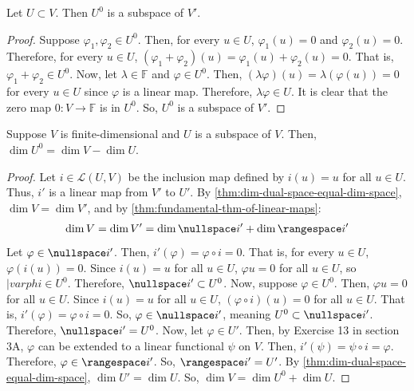 \documentclass{article}
\begin{document}
\begin{theorem}
  \label{thm:the-annihilator-is-a-subspace}
  Let $U \subset V$. Then $U^0$ is a subspace of $V'$.
\end{theorem}
\begin{proof}
  Suppose $\varphi_1, \varphi_2 \in U^0$. Then, for every $u \in U$,
  $\varphi_1(u) = 0$ and $\varphi_2(u) = 0$. Therefore, for every $u
  \in U$, $(\varphi_1 + \varphi_2)(u) = \varphi_1(u) + \varphi_2(u) =
  0$. That is, $\varphi_1 + \varphi_2 \in U^0$. Now, let $\lambda \in
  \mathbb{F}$ and $\varphi \in U^0$. Then, $(\lambda \varphi)(u) =
  \lambda (\varphi(u)) = 0$ for every $u \in U$ since $\varphi$ is a
  linear map. Therefore, $\lambda \varphi \in U$. It is clear that the
  zero map $0: V \rightarrow \mathbb{F}$ is in $U^0$. So, $U^0$ is a
  subspace of $V'$.
\end{proof}

\begin{theorem}
  \label{thm:dimension-of-the-annihilator}
  Suppose $V$ is finite-dimensional and $U$ is a subspace of
  $V$. Then, $\dim U^0 = \dim V - \dim U$.
\end{theorem}
\begin{proof}
  Let $i \in \mathcal{L}(U, V)$ be the inclusion map defined by $i(u)
  = u$ for all $u \in U$. Thus, $i'$ is a linear map from $V'$ to
  $U'$. By \cref{thm:dim-dual-space-equal-dim-space}, $\dim V = \dim
  V'$, and by \cref{thm:fundamental-thm-of-linear-maps}:
  \begin{align*}
    \dim V = \dim V' = \dim \nullspace i' + \dim \rangespace i'
  \end{align*}
  Let $\varphi \in \nullspace i'$. Then, $i'(\varphi) = \varphi \circ
  i = 0$. That is, for every $u \in U$, $\varphi(i(u)) = 0$. Since
  $i(u) = u$ for all $u \in U$, $\varphi u = 0$ for all $u \in U$, so
  $|varphi \in U^0$. Therefore, $\nullspace i' \subset U^0$. Now,
  suppose $\varphi \in U^0$. Then, $\varphi u = 0$ for all $u \in
  U$. Since $i(u) = u$ for all $u \in U$, $(\varphi \circ i)(u) = 0$
  for all $u \in U$. That is, $i'(\varphi) = \varphi \circ i = 0$. So,
  $\varphi \in \nullspace i'$, meaning $U^0 \subset \nullspace
  i'$. Therefore, $\nullspace i' = U^0$. Now, let $\varphi \in
  U'$. Then, by Exercise 13 in section 3A, $\varphi$ can be extended
  to a linear functional $\psi$ on $V$. Then, $i'(\psi) = \psi \circ i
  = \varphi$. Therefore, $\varphi \in \rangespace i'$. So,
  $\rangespace i' = U'$. By \cref{thm:dim-dual-space-equal-dim-space},
  $\dim U' = \dim U$. So, $\dim V = \dim U^0 + \dim U$.
\end{proof}
\end{document}
